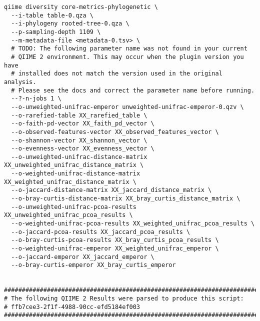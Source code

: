 \begin{footnotesize}
\begin{verbatim}
qiime diversity core-metrics-phylogenetic \
  --i-table table-0.qza \
  --i-phylogeny rooted-tree-0.qza \
  --p-sampling-depth 1109 \
  --m-metadata-file <metadata-0.tsv> \
  # TODO: The following parameter name was not found in your current
  # QIIME 2 environment. This may occur when the plugin version you have
  # installed does not match the version used in the original analysis.
  # Please see the docs and correct the parameter name before running.
  --?-n-jobs 1 \
  --o-unweighted-unifrac-emperor unweighted-unifrac-emperor-0.qzv \
  --o-rarefied-table XX_rarefied_table \
  --o-faith-pd-vector XX_faith_pd_vector \
  --o-observed-features-vector XX_observed_features_vector \
  --o-shannon-vector XX_shannon_vector \
  --o-evenness-vector XX_evenness_vector \
  --o-unweighted-unifrac-distance-matrix XX_unweighted_unifrac_distance_matrix \
  --o-weighted-unifrac-distance-matrix XX_weighted_unifrac_distance_matrix \
  --o-jaccard-distance-matrix XX_jaccard_distance_matrix \
  --o-bray-curtis-distance-matrix XX_bray_curtis_distance_matrix \
  --o-unweighted-unifrac-pcoa-results XX_unweighted_unifrac_pcoa_results \
  --o-weighted-unifrac-pcoa-results XX_weighted_unifrac_pcoa_results \
  --o-jaccard-pcoa-results XX_jaccard_pcoa_results \
  --o-bray-curtis-pcoa-results XX_bray_curtis_pcoa_results \
  --o-weighted-unifrac-emperor XX_weighted_unifrac_emperor \
  --o-jaccard-emperor XX_jaccard_emperor \
  --o-bray-curtis-emperor XX_bray_curtis_emperor


###############################################################################
# The following QIIME 2 Results were parsed to produce this script:
# ffb7cee3-2f1f-4988-90cc-efd5184ef003
###############################################################################
\end{verbatim}
\end{footnotesize}
